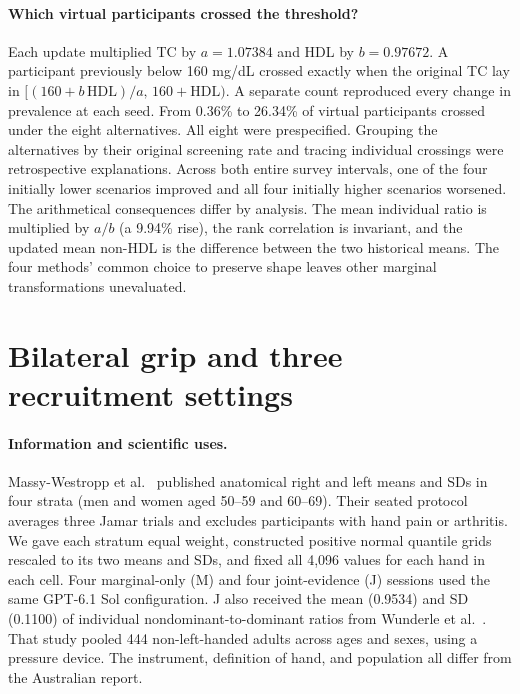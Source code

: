 \paragraph{Which virtual participants crossed the threshold?}
Each update multiplied TC by $a=1.07384$ and HDL by $b=0.97672$. A participant previously below 160 mg/dL crossed exactly when the original TC lay in $[(160+b\,\mathrm{HDL})/a,\,160+\mathrm{HDL})$. A separate count reproduced every change in prevalence at each seed. From 0.36\% to 26.34\% of virtual participants crossed under the eight alternatives. All eight were prespecified. Grouping the alternatives by their original screening rate and tracing individual crossings were retrospective explanations. Across both entire survey intervals, one of the four initially lower scenarios improved and all four initially higher scenarios worsened. The arithmetical consequences differ by analysis. The mean individual ratio is multiplied by $a/b$ (a 9.94\% rise), the rank correlation is invariant, and the updated mean non-HDL is the difference between the two historical means. The four methods' common choice to preserve shape leaves other marginal transformations unevaluated.

\section{Bilateral grip and three recruitment settings}
\label{app:grip}
\paragraph{Information and scientific uses.}
Massy-Westropp et al.~\cite{grip_adelaide} published anatomical right and left means and SDs in four strata (men and women aged 50--59 and 60--69). Their seated protocol averages three Jamar trials and excludes participants with hand pain or arthritis. We gave each stratum equal weight, constructed positive normal quantile grids rescaled to its two means and SDs, and fixed all 4,096 values for each hand in each cell. Four marginal-only (M) and four joint-evidence (J) sessions used the same GPT-6.1 Sol configuration. J also received the mean (0.9534) and SD (0.1100) of individual nondominant-to-dominant ratios from Wunderle et al.~\cite{grip_ratio}. That study pooled 444 non-left-handed adults across ages and sexes, using a pressure device. The instrument, definition of hand, and population all differ from the Australian report.

